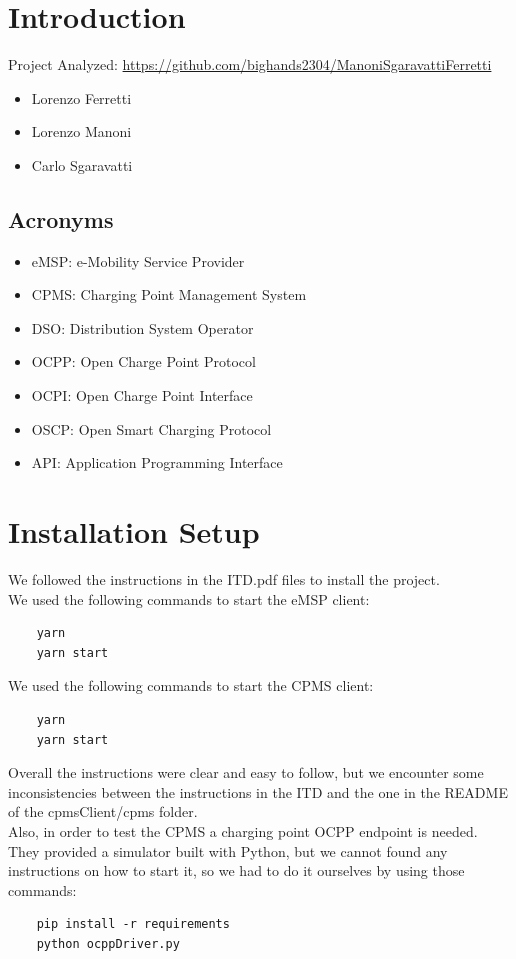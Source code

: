 \documentclass{article}
\begin{document}
\tableofcontents

\newpage

\section{Introduction}
Project Analyzed: \url{https://github.com/bighands2304/ManoniSgaravattiFerretti}

\begin{itemize}
    \item Lorenzo Ferretti
    \item Lorenzo Manoni
    \item Carlo Sgaravatti
\end{itemize}

\subsection{Acronyms}
\begin{itemize}
    \item eMSP: e-Mobility Service Provider
    \item CPMS: Charging Point Management System
    \item DSO: Distribution System Operator
    \item OCPP: Open Charge Point Protocol
    \item OCPI: Open Charge Point Interface
    \item OSCP: Open Smart Charging Protocol
    \item API: Application Programming Interface
\end{itemize}

\section{Installation Setup}
We followed the instructions in the ITD.pdf files to install the project.
\hfill \\
We used the following commands to start the eMSP client:
\begin{lstlisting}
    yarn
    yarn start
\end{lstlisting}

We used the following commands to start the CPMS client:
\begin{lstlisting}
    yarn
    yarn start
\end{lstlisting}



Overall the instructions were clear and easy to follow, but we encounter some inconsistencies between the instructions in the ITD and the one in the README of the cpmsClient/cpms folder.
\hfill \\
Also, in order to test the CPMS a charging point OCPP endpoint is needed. They provided a simulator built with Python, but we cannot found any instructions on how to start it, so we had to do it ourselves by using those commands:
\begin{lstlisting}
    pip install -r requirements
    python ocppDriver.py
\end{lstlisting}
\end{document}
